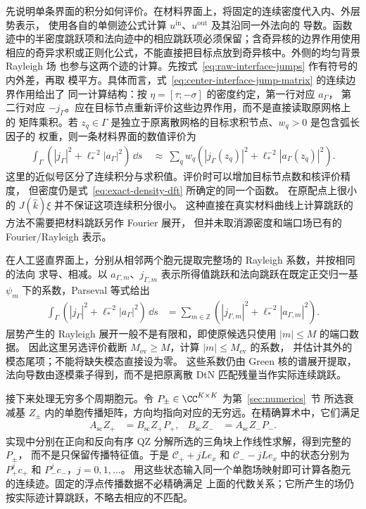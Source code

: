 先说明单条界面的积分如何评价。在材料界面上，将固定的连续密度代入内、外层势表示，
使用各自的单侧迹公式计算 $u^{\mathrm{in}}$、$u^{\mathrm{out}}$ 及其沿同一外法向的
导数。函数迹中的半密度跳跃项和法向迹中的相应跳跃项必须保留；含奇异核的边界作用使用
相应的奇异求积或正则化公式，不能直接把目标点放到奇异核中。外侧的均匀背景 Rayleigh 场
也参与这两个迹的计算。先按式~\eqref{eq:raw-interface-jumps} 作有符号的内外差，再取
模平方。具体而言，式~\eqref{eq:center-interface-jump-matrix} 的连续边界作用给出了
同一计算结构：按 $\eta=[\tau;-\sigma]$ 的密度约定，第一行对应 $a_\Gamma$，
第二行对应 $-j_\Gamma$。应在目标节点重新评价这些边界作用，而不是直接读取原网格上的
矩阵乘积。若 $z_q\in\Gamma$ 是独立于原离散网格的目标求积节点、$w_q>0$ 是包含弧长因子的
权重，则一条材料界面的数值评价为
\begin{align}
  \int_\Gamma\left(|j_\Gamma|^2+\ell_*^{-2}|a_\Gamma|^2\right)\,\dd s
  &\ \approx\
  \sum_q w_q\left(
    |j_\Gamma(z_q)|^2+\ell_*^{-2}|a_\Gamma(z_q)|^2
  \right).
  \label{eq:material-jump-quadrature}
\end{align}
这里的近似号区分了连续积分与求积值。评价时可以增加目标节点数和核评价精度，
但密度仍是式~\eqref{eq:exact-density-dft} 所确定的同一个函数。
在原配点上很小的 $J(\widehat k)\xi$ 并不保证这项连续积分很小。
这种直接在真实材料曲线上计算跳跃的方法不需要把材料跳跃另作 Fourier 展开，
但并未取消源密度和端口场已有的 Fourier/Rayleigh 表示。

在人工竖直界面上，分别从相邻两个胞元提取完整场的 Rayleigh 系数，并按相同的法向
求导、相减。以 $a_{\Gamma,m}$、$j_{\Gamma,m}$ 表示所得值跳跃和法向跳跃在既定正交归一基
$\psi_m$ 下的系数，Parseval 等式给出
\begin{align}
  \int_\Gamma\left(|j_\Gamma|^2+\ell_*^{-2}|a_\Gamma|^2\right)\,\dd s
  &=
  \sum_{m\in\mathbb Z}
  \left(|j_{\Gamma,m}|^2+\ell_*^{-2}|a_{\Gamma,m}|^2\right).
  \label{eq:artificial-jump-parseval}
\end{align}
层势产生的 Rayleigh 展开一般不是有限和，即使原候选只使用 $|m|\leq M$ 的端口数据。
因此这里另选评价截断 $M_{\mathrm{ev}}\geq M$，计算 $|m|\leq M_{\mathrm{ev}}$ 的系数，
并估计其外的模态尾项；不能将缺失模态直接设为零。
这些系数仍由 Green 核的谱展开提取，法向导数由逐模乘子得到，而不是把原离散 DtN
匹配残量当作实际连续跳跃。

接下来处理无穷多个周期胞元。令 $P_\pm\in\CC^{K\times K}$ 为第~\ref{sec:numerics}~节
所选衰减基 $Z_\pm$ 内的单胞传播矩阵，方向均指向对应的无穷远。在精确算术中，它们满足
\begin{align*}
  A_{\mathrm{sc}}Z_+&=B_{\mathrm{sc}}Z_+P_+,
  &B_{\mathrm{sc}}Z_-&=A_{\mathrm{sc}}Z_-P_-.
\end{align*}
实现中分别在正向和反向有序 QZ 分解所选的三角块上作线性求解，得到完整的 $P_\pm$，
而不是只保留传播特征值。于是 $\mathcal C_++jLe_x$ 和
$\mathcal C_--jLe_x$ 中的状态分别为 $P_+^jc_+$ 和 $P_-^jc_-$，$j=0,1,\ldots$。
用这些状态输入同一个单胞场映射即可计算各胞元的连续迹。固定的浮点传播数据不必精确满足
上面的代数关系；它所产生的场仍按实际迹计算跳跃，不略去相应的不匹配。

